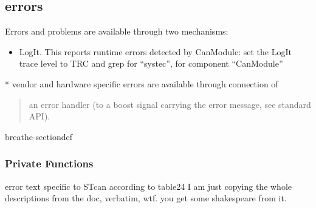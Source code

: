 \documentclass[a4paper,10pt,english]{sphinxmanual}
\begin{document}
\subsection{errors}
\label{\detokenize{vendors/systec:errors}}
\sphinxAtStartPar
Errors and problems are available through two mechanisms:
\begin{itemize}
\item {} 
\sphinxAtStartPar
LogIt. This reports runtime errors detected by CanModule:
set the LogIt trace level to TRC and grep for “systec”, for component “CanModule”

\end{itemize}

\sphinxAtStartPar
{}
* vendor and hardware specific errors are available through connection of
\begin{quote}

\sphinxAtStartPar
an error handler (to a boost signal carrying the error message, see standard API).
\end{quote}

\begin{fulllineitems}
%
\pysigstartmultiline
{}%
\pysigstopmultiline
\begin{sphinxuseclass}{breathe-sectiondef}\subsubsection*{Private Functions}

\begin{fulllineitems}
\label{\detokenize{vendors/systec:_CPPv4N9STCanScan17STcanGetErrorTextEl}}%
\pysigstartmultiline
{}%
\pysigstopmultiline
\sphinxAtStartPar
error text specific to STcan according to table24 I am just copying the whole descriptions from the doc, verbatim, wtf. you get some shakespeare from it. 

\end{fulllineitems}


\end{sphinxuseclass}
\end{fulllineitems}
\end{document}
